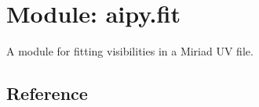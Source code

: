 \section{Module: aipy.fit}

A module for fitting visibilities in a Miriad UV file.

\subsection{Reference}

